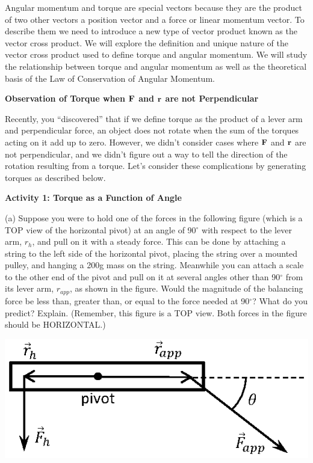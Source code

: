 Angular momentum and torque are special vectors because they are the product
of two other vectors a position vector and a force or linear momentum vector.
To describe them we need to introduce a new type of vector product known as
the vector cross product. We will explore the definition and unique nature of
the vector cross product used to define torque and angular momentum. We will
study the relationship between torque and angular momentum as well as the theoretical
basis of the Law of Conservation of Angular Momentum.

\textbf{Observation of Torque when \( {\bf F} \) and \( {\bf r} \)
are not Perpendicular} 

Recently, you ``discovered'' that if we define torque as the
product of a lever arm and perpendicular force, an object does not rotate when
the sum of the torques acting on it add up to zero. However, we didn't consider
cases where \textbf{\( {\bf F} \)} and \textbf{\( {\bf r} \)}
are not perpendicular, and we didn't figure out a way to tell the direction
of the rotation resulting from a torque. Let's consider these complications
by generating torques as described below.

\textbf{Activity 1: Torque as a Function of Angle} 

(a) Suppose you were to hold one of the forces in the following figure (which is a TOP view of the horizontal pivot) at an angle of 90\( ^{\circ } \)
with respect to the lever arm, \( r_{h} \), and pull on it with a steady force.
This can be done by attaching a string to the left side of the horizontal pivot, placing the string over a mounted pulley, and hanging a 200g mass on the string. Meanwhile you can attach a scale to the other end of the pivot and pull on it at several angles other than 90\( ^{\circ } \)
from its lever arm, \( r_{app} \), as shown in the figure. Would the magnitude of the balancing force be less than, greater than, or equal to the force needed at 90\( ^{\circ } \)? What do you predict? Explain. (Remember, this figure is a TOP view. Both forces in the figure should be HORIZONTAL.)
{\par\raggedright \includegraphics{ang_mom/ang_mom_fig1_new.eps} \par}

